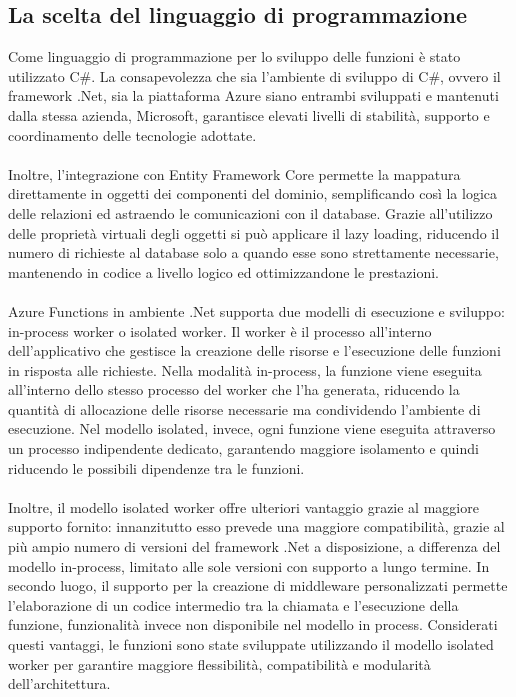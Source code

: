 \subsection{La scelta del linguaggio di programmazione}
Come linguaggio di programmazione per lo sviluppo delle funzioni è stato utilizzato C\#.
La consapevolezza che sia l’ambiente di sviluppo di C\#, ovvero il framework .Net, sia la piattaforma Azure siano entrambi sviluppati e mantenuti dalla stessa azienda, Microsoft,
garantisce elevati livelli di stabilità, supporto e coordinamento delle tecnologie adottate.\\
\\
Inoltre, l’integrazione con Entity Framework Core permette la mappatura direttamente in oggetti dei componenti del dominio, 
semplificando così la logica delle relazioni ed astraendo le comunicazioni con il database.
Grazie all’utilizzo delle proprietà virtuali degli oggetti si può applicare il lazy loading, 
riducendo il numero di richieste al database solo a quando esse sono strettamente necessarie, mantenendo in codice a livello logico ed ottimizzandone le prestazioni.\\
\\
Azure Functions in ambiente .Net supporta due modelli di esecuzione e sviluppo: in-process worker o isolated worker.
Il worker è il processo all’interno dell’applicativo che gestisce la creazione delle risorse e l’esecuzione delle funzioni in risposta alle richieste.
Nella modalità in-process, la funzione viene eseguita all’interno dello stesso processo del worker che l’ha generata,
riducendo la quantità di allocazione delle risorse necessarie ma condividendo l’ambiente di esecuzione.
Nel modello isolated, invece, ogni funzione viene eseguita attraverso un processo indipendente dedicato,
garantendo maggiore isolamento e quindi riducendo le possibili dipendenze tra le funzioni. \\
\\
Inoltre, il modello isolated worker offre ulteriori vantaggio grazie al maggiore supporto fornito:
innanzitutto esso prevede una maggiore compatibilità, grazie al più ampio numero di versioni del framework .Net a disposizione,
a differenza del modello in-process, limitato alle sole versioni con supporto a lungo termine.
In secondo luogo, il supporto per la creazione di middleware personalizzati 
permette l’elaborazione di un codice intermedio tra la chiamata e l’esecuzione della funzione,
funzionalità invece non disponibile nel modello in process.
Considerati questi vantaggi, le funzioni sono state sviluppate utilizzando il modello isolated worker 
per garantire maggiore flessibilità, compatibilità e modularità dell’architettura.
\clearpage


